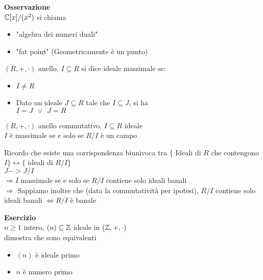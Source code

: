 \documentclass{article}
\begin{document}
	 \textbf{Osservazione}\\
	 $\mathbb{C}[x]/(x^2)$ si chiama
	 \begin{itemize}
		 \item "algebra dei numeri duali"
		 \item "fat point" (Geometricamente è un punto)
	 \end{itemize}
	 \begin{defi}
		 $(R,+,\cdot)$ anello, $I\subseteq R$ si dice ideale massimale se:\\
		 \begin{itemize}
			 \item $I\neq R$
			 \item Dato un ideale $J\subseteq R$ tale che $I\subseteq J$, si ha\\
				 $I = J \ \ \vee \ \ J = R$

		 \end{itemize}
	 \end{defi}
	 \begin{teo}
	 	$(R,+,\cdot)$ anello commutativo,  $I\subseteq R$ ideale\\
		$I$ è massimale se e solo se $R/I$ è un campo
	 \end{teo}
	 \begin{dimo}
		 Ricordo che esiste una corrispondenza biunivoca tra $\{$ Ideali di $R$ che  contengono $I\} \leftrightarrow\{$  ideali di  $R/I\}$\\
		  $J -> J/I$\\
		   $ \Rightarrow I$ massimale se e solo se $R/I$ contiene solo ideali banali\\
		   $ \Rightarrow $ Sappiamo inoltre che (data la commutatività per ipotesi), $R/I$ contiene solo ideali banali  $ \Leftrightarrow R/I$ è banale
	 \end{dimo}
	 \textbf{Esercizio}\\
	 $n\geq 1 $ intero, $(n)\subseteq \mathbb{Z}$ ideale in  $(\mathbb{Z},+,\cdot)$\\
	 dimostra che sono equivalenti
	  \begin{itemize}
		  \item $(n) $ è ideale primo\\
		  \item $n$ è numero primo
	 \end{itemize}
\end{document}
